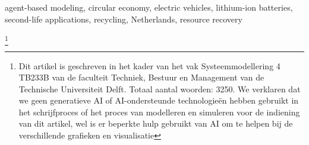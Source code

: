 \documentclass[conference]{IEEEtran}
\begin{document}
\begin{IEEEkeywords}
agent-based modeling, circular economy, electric vehicles, lithium-ion batteries, second-life applications, recycling, Netherlands, resource recovery
\end{IEEEkeywords}

\footnote{Dit artikel is geschreven in het kader van het vak Systeemmodellering 4 TB233B van de faculteit Techniek, Bestuur en Management van de
Technische Universiteit Delft. Totaal aantal woorden: 3250. We verklaren dat we geen generatieve AI of AI-ondersteunde technologieën hebben gebruikt in het schrijfproces of het proces van modelleren en simuleren voor de indiening van dit artikel, wel is er beperkte hulp gebruikt van AI om te helpen bij de verschillende grafieken en visualisatie}











\clearpage


\end{document}
